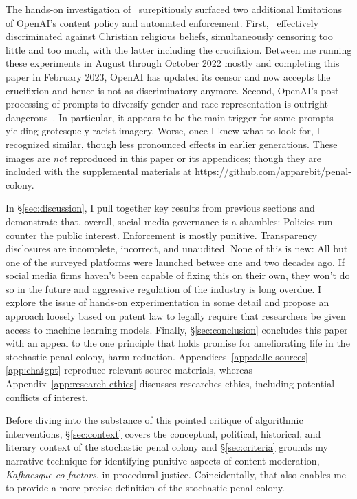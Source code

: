 The hands-on investigation of \DALLE\ surepitiously surfaced two additional
limitations of OpenAI's content policy and automated enforcement. First, \DALLE\
effectively discriminated against Christian religious beliefs, simultaneously
censoring too little and too much, with the latter including the crucifixion.
Between me running these experiments in August through October 2022 mostly and
completing this paper in February 2023, OpenAI has updated its censor and now
accepts the crucifixion and hence is not as discriminatory anymore. Second,
OpenAI's post-processing of prompts to diversify gender and race representation
is outright dangerous~\cite{OpenAI2022e,Sparkes2022}. In particular, it appears
to be the main trigger for some prompts yielding grotesquely racist imagery.
Worse, once I knew what to look for, I recognized similar, though less
pronounced effects in earlier generations. These images are \emph{not}
reproduced in this paper or its appendices; though they are included with the
supplemental materials at \url{https://github.com/apparebit/penal-colony}.

In \S\ref{sec:discussion}, I pull together key results from previous sections
and demonstrate that, overall, social media governance is a shambles: Policies
run counter the public interest. Enforcement is mostly punitive. Transparency
disclosures are incomplete, incorrect, and unaudited. None of this is new: All
but one of the surveyed platforms were launched betwee one and two decades ago.
If social media firms haven't been capable of fixing this on their own, they
won't do so in the future and aggressive regulation of the industry is long
overdue. I explore the issue of hands-on experimentation in some detail and
propose an approach loosely based on patent law to legally require that
researchers be given access to machine learning models. Finally,
\S\ref{sec:conclusion} concludes this paper with an appeal to the one principle
that holds promise for ameliorating life in the stochastic penal colony, harm
reduction. Appendices~\ref{app:dalle-sources}--\ref{app:chatgpt} reproduce
relevant source materials, whereas Appendix~\ref{app:research-ethics} discusses
researches ethics, including potential conflicts of interest.

Before diving into the substance of this pointed critique of algorithmic
interventions, \S\ref{sec:context} covers the conceptual, political, historical,
and literary context of the stochastic penal colony and \S\ref{sec:criteria}
grounds my narrative technique for identifying punitive aspects of content
moderation, \emph{Kafkaesque co-factors}, in procedural justice. Coincidentally,
that also enables me to provide a more precise definition of the stochastic
penal colony.


